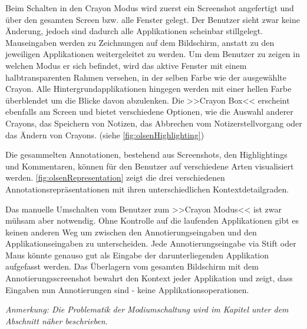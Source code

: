 \medskip Beim Schalten in den Crayon Modus wird zuerst ein Screenshot angefertigt und über den gesamten Screen bzw. alle Fenster gelegt. Der Benutzer sieht zwar keine Änderung, jedoch sind dadurch alle Applikationen scheinbar stillgelegt. Mauseingaben werden zu Zeichnungen auf dem Bildschirm, anstatt zu den jeweiligen Applikationen weitergeleitet zu werden. Um dem Benutzer zu zeigen in welchen Modus er sich befindet,  wird das aktive Fenster mit einem halbtransparenten Rahmen versehen, in der selben Farbe wie der ausgewählte Crayon. Alle Hintergrundapplikationen hingegen werden mit einer hellen Farbe überblendet um die Blicke davon abzulenken. Die >>Crayon Box<< erscheint ebenfalls am Screen und bietet verschiedene Optionen, wie die Auswahl anderer Crayons, das Speichern von Notizen, das Abbrechen vom Notizerstellvorgang oder das Ändern von Crayons. (siehe \autoref{fig:olsenHighlighting})

\medskip Die gesammelten Annotationen, bestehend aus Screenshots, den Highlightings und Kommentaren, können für den Benutzer auf verschiedene Arten visualisiert werden. \autoref{fig:olsenRepresentation} zeigt die drei verschiedenen Annotationsrepräsentationen mit ihren unterschiedlichen Kontextdetailgraden.

\medskip Das manuelle Umschalten vom Benutzer  zum >>Crayon Modus<< ist zwar mühsam aber notwendig. Ohne Kontrolle auf die laufenden Applikationen gibt es keinen anderen Weg um zwischen den Annotierungseingaben und den Applikationseingaben zu unterscheiden. Jede Annotierungseingabe via Stift oder Maus könnte genauso gut als Eingabe der darunterliegenden Applikation aufgefasst werden. Das Überlagern vom gesamten Bildschirm mit dem Annotierungsscreenshot bewahrt den Kontext jeder Applikation und zeigt, dass Eingaben nun Annotierungen sind - keine Applikationsoperationen.

\bigskip \emph{Anmerkung: \graffito{\(\clubsuit\)}Die Problematik der Modiumschaltung wird im Kapitel  unter dem Abschnitt  näher beschrieben.}

